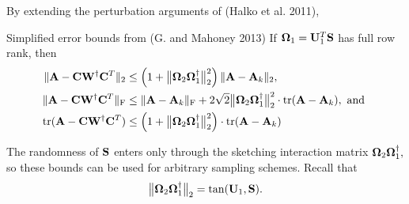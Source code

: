 \documentclass[xcolor=x11names,compress,ignorenonframetext,10pt]{beamer}
\renewcommand{\(}{\begin{columns}}
\renewcommand{\)}{\end{columns}}
\newcommand{\<}[1]{\begin{column}{#1}}
\renewcommand{\>}{\end{column}}
\def\refcolor{DodgerBlue4}
\newcommand{\refer}[1]{({\color{\refcolor}#1})}
\begin{document}
\begin{frame} 
 By extending the perturbation arguments of \refer{Halko et al. 2011}, 
 
 \begin{block}{Simplified error bounds from \refer{G. and Mahoney 2013}}
 If $\boldsymbol{\Omega}_1 = \mathbf{U}_1^T \mathbf{S}$ has full row rank, then
 \begin{align*}
 \|\mathbf{A} - \mathbf{C} \mathbf{W}^\dagger \mathbf{C}^T\|_2 & \leq \left(1 + \big\|\boldsymbol{\Omega}_2 \boldsymbol{\Omega}_1^\dagger\big\|_2^2\right) \|\mathbf{A} - \mathbf{A}_k\|_2 , \\
 \|\mathbf{A} - \mathbf{C} \mathbf{W}^\dagger \mathbf{C}^T\|_{\mathrm{F}} & \leq \|\mathbf{A} - \mathbf{A}_k\|_{\mathrm{F}} + 2\sqrt{2} 
 \big\| {\boldsymbol{\Omega}_2 \boldsymbol{\Omega}_1^\dagger} \big\|_2^2 \cdot \operatorname{tr}(\mathbf{A} - \mathbf{A}_k), \text{ and } \\
 \operatorname{tr}(\mathbf{A} - \mathbf{C} \mathbf{W}^\dagger \mathbf{C}^T) & \leq 
  \left(1+ \big\| { \boldsymbol{\Omega}_2 \boldsymbol{\Omega}_1^\dagger} \big\|_2^2 \right) \cdot \operatorname{tr}(\mathbf{A} - \mathbf{A}_k)
 \end{align*}
 \end{block}
 
 The randomness of $\mathbf{S}$ enters only through the sketching interaction matrix  ${\boldsymbol{\Omega}_2 \boldsymbol{\Omega}_1^\dagger},$
 so these bounds can be used for arbitrary sampling schemes. Recall that
 \[
   \big\|\boldsymbol{\Omega}_2 \boldsymbol{\Omega}_1^\dagger\big\|_2 = \tan(\mathbf{U}_1, \mathbf{S}).
 \]

\end{frame}
\end{document}
